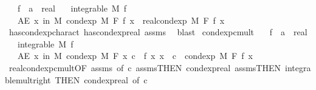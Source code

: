\begin{isabellebody}
\ \ \ f\ {\isacharcolon}{\kern0pt}{\isacharcolon}{\kern0pt}\ {\isachardoublequoteopen}{\isacharprime}{\kern0pt}a\ {\isasymRightarrow}\ real{\isachardoublequoteclose}\isanewline
\ \ \ {\isachardoublequoteopen}integrable\ M\ f{\isachardoublequoteclose}\isanewline
\ \ \ {\isachardoublequoteopen}AE\ x\ in\ M{\isachardot}{\kern0pt}\ cond{\isacharunderscore}{\kern0pt}exp\ M\ F\ f\ x\ {\isacharequal}{\kern0pt}\ real{\isacharunderscore}{\kern0pt}cond{\isacharunderscore}{\kern0pt}exp\ M\ F\ f\ x{\isachardoublequoteclose}\ \isanewline
%
\isadelimproof
\ \ %
\endisadelimproof
%
\isatagproof
{}\isamarkupfalse%
\ has{\isacharunderscore}{\kern0pt}cond{\isacharunderscore}{\kern0pt}exp{\isacharunderscore}{\kern0pt}charact\ has{\isacharunderscore}{\kern0pt}cond{\isacharunderscore}{\kern0pt}exp{\isacharunderscore}{\kern0pt}real\ assms\ \isamarkupfalse%
\ blast%
\endisatagproof
{\isafoldproof}%
%
\isadelimproof
\isanewline
%
\endisadelimproof
\isanewline
{}\isamarkupfalse%
\ cond{\isacharunderscore}{\kern0pt}exp{\isacharunderscore}{\kern0pt}cmult{\isacharcolon}{\kern0pt}\isanewline
\ \ \ f\ {\isacharcolon}{\kern0pt}{\isacharcolon}{\kern0pt}\ {\isachardoublequoteopen}{\isacharprime}{\kern0pt}a\ {\isasymRightarrow}\ real{\isachardoublequoteclose}\isanewline
\ \ \ {\isachardoublequoteopen}integrable\ M\ f{\isachardoublequoteclose}\isanewline
\ \ \ {\isachardoublequoteopen}AE\ x\ in\ M{\isachardot}{\kern0pt}\ cond{\isacharunderscore}{\kern0pt}exp\ M\ F\ {\isacharparenleft}{\kern0pt}{\isasymlambda}x{\isachardot}{\kern0pt}\ c\ {\isacharasterisk}{\kern0pt}\ f\ x{\isacharparenright}{\kern0pt}\ x\ {\isacharequal}{\kern0pt}\ c\ {\isacharasterisk}{\kern0pt}\ cond{\isacharunderscore}{\kern0pt}exp\ M\ F\ f\ x{\isachardoublequoteclose}\isanewline
%
\isadelimproof
\ \ %
\endisadelimproof
%
\isatagproof
{}\isamarkupfalse%
\ real{\isacharunderscore}{\kern0pt}cond{\isacharunderscore}{\kern0pt}exp{\isacharunderscore}{\kern0pt}cmult{\isacharbrackleft}{\kern0pt}OF\ assms{\isacharparenleft}{\kern0pt}{}{\isacharparenright}{\kern0pt}{\isacharcomma}{\kern0pt}\ of\ c{\isacharbrackright}{\kern0pt}\ assms{\isacharparenleft}{\kern0pt}{}{\isacharparenright}{\kern0pt}{\isacharbrackleft}{\kern0pt}THEN\ cond{\isacharunderscore}{\kern0pt}exp{\isacharunderscore}{\kern0pt}real{\isacharbrackright}{\kern0pt}\ assms{\isacharparenleft}{\kern0pt}{}{\isacharparenright}{\kern0pt}{\isacharbrackleft}{\kern0pt}THEN\ integrable{\isacharunderscore}{\kern0pt}mult{\isacharunderscore}{\kern0pt}right{\isacharcomma}{\kern0pt}\ THEN\ cond{\isacharunderscore}{\kern0pt}exp{\isacharunderscore}{\kern0pt}real{\isacharcomma}{\kern0pt}\ of\ c{\isacharbrackright}{\kern0pt}\ \isamarkupfalse%

\end{isabellebody}
